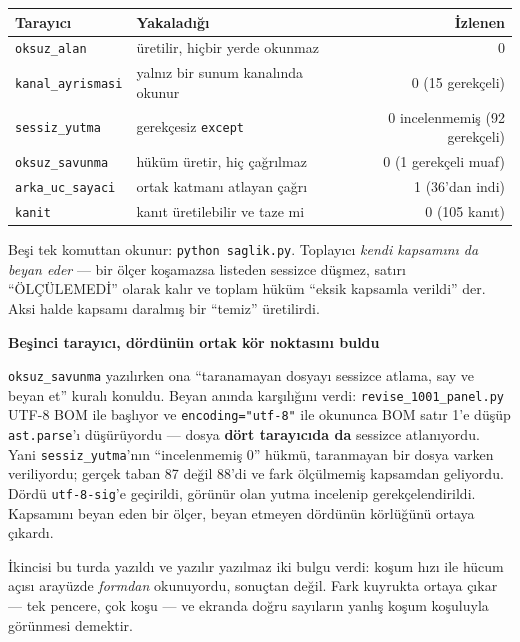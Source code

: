 \documentclass[11pt,a4paper]{article}
\newcommand{\kkkenar}{lacivert}
\newcommand{\kkzemin}{kod}
\newenvironment{renkkutu}[3]{%
  \renewcommand{\kkkenar}{#1}\renewcommand{\kkzemin}{#2}%
  \par\medskip\noindent
  \begin{lrbox}{\kutugovde}%
  \begin{minipage}{\dimexpr\linewidth-2\fboxsep-2\fboxrule\relax}\footnotesize
  \textcolor{#1}{\textbf{#3}}\par\vspace{3pt}%
}{%
  \end{minipage}%
  \end{lrbox}%
  \noindent\fcolorbox{\kkkenar}{\kkzemin}{\usebox{\kutugovde}}%
  \par\medskip
}
\newenvironment{olculdu}[1]{\begin{renkkutu}{iyi}{iyibg}{#1}}{\end{renkkutu}}
\begin{document}
\begin{center}\footnotesize
\begin{tabular}{@{}llr@{}}
\toprule
\textbf{Tarayıcı} & \textbf{Yakaladığı} & \textbf{İzlenen} \\
\midrule
\texttt{oksuz\_alan} & üretilir, hiçbir yerde okunmaz & 0 \\
\texttt{kanal\_ayrismasi} & yalnız bir sunum kanalında okunur & 0 (15 gerekçeli) \\
\texttt{sessiz\_yutma} & gerekçesiz \texttt{except} & 0 incelenmemiş (92 gerekçeli) \\
\texttt{oksuz\_savunma} & hüküm üretir, hiç çağrılmaz & 0 (1 gerekçeli muaf) \\
\texttt{arka\_uc\_sayaci} & ortak katmanı atlayan çağrı & 1 (36'dan indi) \\
\texttt{kanit} & kanıt üretilebilir ve taze mi & 0 (105 kanıt) \\
\bottomrule
\end{tabular}
\end{center}

\noindent Beşi tek komuttan okunur: \texttt{python saglik.py}. Toplayıcı
\emph{kendi kapsamını da beyan eder} --- bir ölçer koşamazsa listeden sessizce
düşmez, satırı ``ÖLÇÜLEMEDİ'' olarak kalır ve toplam hüküm ``eksik kapsamla
verildi'' der. Aksi halde kapsamı daralmış bir ``temiz'' üretilirdi.

\begin{olculdu}{Beşinci tarayıcı, dördünün ortak kör noktasını buldu}
\texttt{oksuz\_savunma} yazılırken ona ``taranamayan dosyayı sessizce atlama,
say ve beyan et'' kuralı konuldu. Beyan anında karşılığını verdi:
\texttt{revise\_1001\_panel.py} UTF-8 BOM ile başlıyor ve
\texttt{encoding="utf-8"} ile okununca BOM satır 1'e düşüp \texttt{ast.parse}'ı
düşürüyordu --- dosya \textbf{dört tarayıcıda da} sessizce atlanıyordu.
Yani \texttt{sessiz\_yutma}'nın ``incelenmemiş 0'' hükmü, taranmayan bir dosya
varken veriliyordu; gerçek taban 87 değil 88'di ve fark ölçülmemiş kapsamdan
geliyordu. Dördü \texttt{utf-8-sig}'e geçirildi, görünür olan yutma incelenip
gerekçelendirildi. Kapsamını beyan eden bir ölçer, beyan etmeyen dördünün
körlüğünü ortaya çıkardı.
\end{olculdu}

\noindent İkincisi bu turda yazıldı ve yazılır yazılmaz iki bulgu verdi: koşum
hızı ile hücum açısı arayüzde \emph{formdan} okunuyordu, sonuçtan değil. Fark
kuyrukta ortaya çıkar --- tek pencere, çok koşu --- ve ekranda doğru sayıların
yanlış koşum koşuluyla görünmesi demektir.
\end{document}
